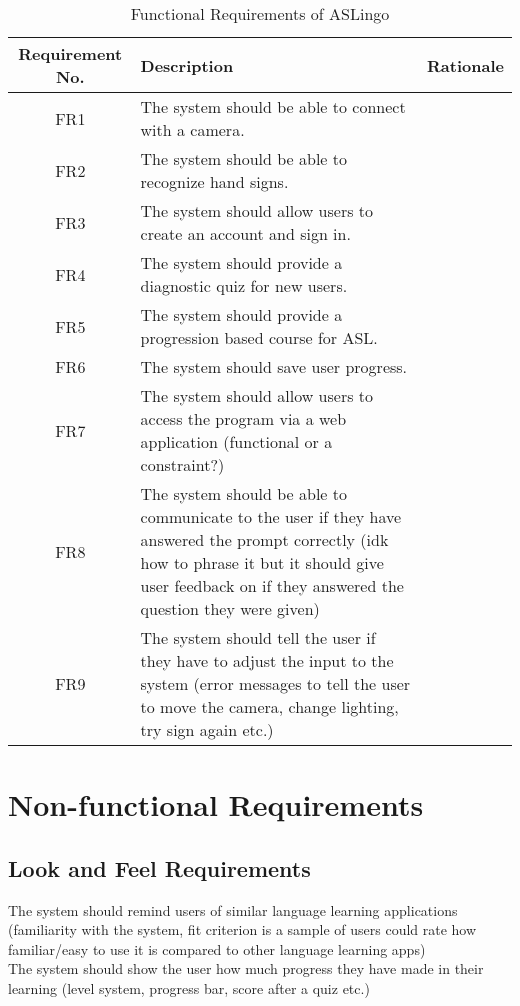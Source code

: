 \documentclass[12pt, titlepage]{article}
\begin{document}
\begin{table}
\caption{Functional Requirements of ASLingo}
\noindent \begin{tabular}{| c | p{4cm}| p{5cm}|}
\toprule 
\textbf{Requirement No.} & \textbf{Description} &\textbf{Rationale}\\
\midrule
FR1 & The system should be able to connect with a camera. & \\
\hline
FR2 & The system should be able to recognize hand signs. & \\
\hline
FR3 & The system should allow users to create an account and sign in. & \\
\hline
FR4 & The system should provide a diagnostic quiz for new users. & \\
\hline
FR5 & The system should provide a progression based course for ASL. & \\
\hline
FR6 & The system should save user progress. & \\
\hline
FR7 & The system should allow users to access the program via a web application (functional or a constraint?) & \\
\hline
FR8 & The system should be able to communicate to the user if they have answered the prompt correctly (idk how to phrase it but it should give user feedback on if they answered the question they were given) & \\
\hline
FR9 & The system should tell the user if they have to adjust the input to the system (error messages to tell the user to move the camera, change lighting, try sign again etc.) & \\
\bottomrule
\end{tabular}
\end{table}

\section{Non-functional Requirements}

\subsection{Look and Feel Requirements}

The system should remind users of similar language learning applications (familiarity with the system, fit criterion is a sample of users could rate how familiar/easy to use it is compared to other language learning apps) \\

The system should show the user how much progress they have made in their learning (level system, progress bar, score after a quiz etc.) \\
\end{document}
